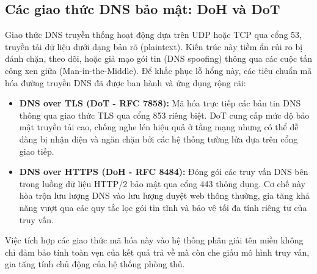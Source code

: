 \subsection{Các giao thức DNS bảo mật: DoH và DoT}
Giao thức DNS truyền thống hoạt động dựa trên UDP hoặc TCP qua cổng 53, truyền tải dữ liệu dưới dạng bản rõ (plaintext). Kiến trúc này tiềm ẩn rủi ro bị đánh chặn, theo dõi, hoặc giả mạo gói tin (DNS spoofing) thông qua các cuộc tấn công xen giữa (Man-in-the-Middle). Để khắc phục lỗ hổng này, các tiêu chuẩn mã hóa đường truyền DNS đã được ban hành và ứng dụng rộng rãi:
\begin{itemize}
    \item \textbf{DNS over TLS (DoT - RFC 7858):} Mã hóa trực tiếp các bản tin DNS thông qua giao thức TLS qua cổng 853 riêng biệt. DoT cung cấp mức độ bảo mật truyền tải cao, chống nghe lén hiệu quả ở tầng mạng nhưng có thể dễ dàng bị nhận diện và ngăn chặn bởi các hệ thống tường lửa dựa trên cổng giao tiếp.
    \item \textbf{DNS over HTTPS (DoH - RFC 8484):} Đóng gói các truy vấn DNS bên trong luồng dữ liệu HTTP/2 bảo mật qua cổng 443 thông dụng. Cơ chế này hòa trộn lưu lượng DNS vào lưu lượng duyệt web thông thường, gia tăng khả năng vượt qua các quy tắc lọc gói tin tĩnh và bảo vệ tối đa tính riêng tư của truy vấn.
\end{itemize}
Việc tích hợp các giao thức mã hóa này vào hệ thống phân giải tên miền không chỉ đảm bảo tính toàn vẹn của kết quả trả về mà còn che giấu mô hình truy vấn, gia tăng tính chủ động của hệ thống phòng thủ.
